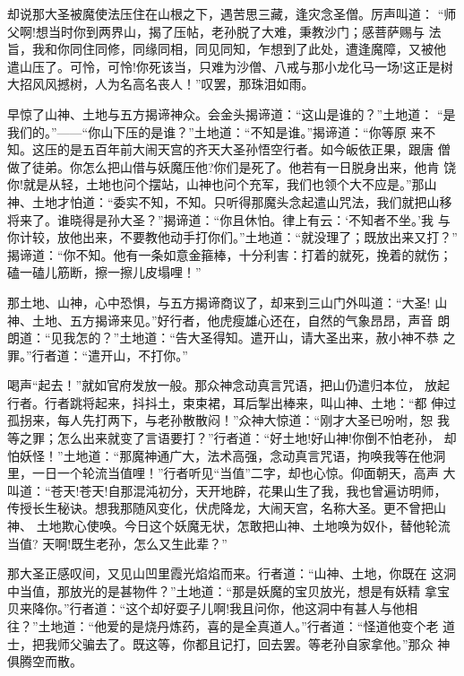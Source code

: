 却说那大圣被魔使法压住在山根之下，遇苦思三藏，逢灾念圣僧。厉声叫道：
“师父啊!想当时你到两界山，揭了压帖，老孙脱了大难，秉教沙门；感菩萨赐与
法旨，我和你同住同修，同缘同相，同见同知，乍想到了此处，遭逢魔障，又被他
遣山压了。可怜，可怜!你死该当，只难为沙僧、八戒与那小龙化马一场!这正是树
大招风风撼树，人为名高名丧人！”叹罢，那珠泪如雨。

早惊了山神、土地与五方揭谛神众。会金头揭谛道：“这山是谁的？”土地道：
“是我们的。”——“你山下压的是谁？”土地道：“不知是谁。”揭谛道：“你等原
来不知。这压的是五百年前大闹天宫的齐天大圣孙悟空行者。如今皈依正果，跟唐
僧做了徒弟。你怎么把山借与妖魔压他?你们是死了。他若有一日脱身出来，他肯
饶你!就是从轻，土地也问个摆站，山神也问个充军，我们也领个大不应是。”那山
神、土地才怕道：“委实不知，不知。只听得那魔头念起遣山咒法，我们就把山移
将来了。谁晓得是孙大圣？”揭谛道：“你且休怕。律上有云：‘不知者不坐。’我
与你计较，放他出来，不要教他动手打你们。”土地道：“就没理了；既放出来又打？”
揭谛道：“你不知。他有一条如意金箍棒，十分利害：打着的就死，挽着的就伤；
磕一磕儿筋断，擦一擦儿皮塌哩！”

那土地、山神，心中恐惧，与五方揭谛商议了，却来到三山门外叫道：“大圣!
山神、土地、五方揭谛来见。”好行者，他虎瘦雄心还在，自然的气象昂昂，声音
朗朗道：“见我怎的？”土地道：“告大圣得知。遣开山，请大圣出来，赦小神不恭
之罪。”行者道：“遣开山，不打你。”

喝声“起去！”就如官府发放一般。那众神念动真言咒语，把山仍遣归本位，
放起行者。行者跳将起来，抖抖土，束束裙，耳后掣出棒来，叫山神、土地：“都
伸过孤拐来，每人先打两下，与老孙散散闷！”众神大惊道：“刚才大圣已吩咐，恕
我等之罪；怎么出来就变了言语要打？”行者道：“好土地!好山神!你倒不怕老孙，
却怕妖怪！”土地道：“那魔神通广大，法术高强，念动真言咒语，拘唤我等在他洞
里，一日一个轮流当值哩！”行者听见“当值”二字，却也心惊。仰面朝天，高声
大叫道：“苍天!苍天!自那混沌初分，天开地辟，花果山生了我，我也曾遍访明师，
传授长生秘诀。想我那随风变化，伏虎降龙，大闹天宫，名称大圣。更不曾把山神、
土地欺心使唤。今日这个妖魔无状，怎敢把山神、土地唤为奴仆，替他轮流当值?
天啊!既生老孙，怎么又生此辈？”

那大圣正感叹间，又见山凹里霞光焰焰而来。行者道：“山神、土地，你既在
这洞中当值，那放光的是甚物件？”土地道：“那是妖魔的宝贝放光，想是有妖精
拿宝贝来降你。”行者道：“这个却好耍子儿啊!我且问你，他这洞中有甚人与他相
往？”土地道：“他爱的是烧丹炼药，喜的是全真道人。”行者道：“怪道他变个老
道士，把我师父骗去了。既这等，你都且记打，回去罢。等老孙自家拿他。”那众
神俱腾空而散。

